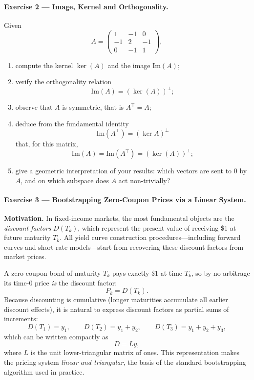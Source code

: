 \documentclass[11pt]{article}
\begin{document}
\paragraph{Exercise 2 — Image, Kernel and Orthogonality.}
Given
\[
A=\begin{pmatrix}
1 & -1 & 0 \\
-1 & 2 & -1 \\
0 & -1 & 1
\end{pmatrix},
\]
\begin{enumerate}
\item compute the kernel $\ker(A)$ and the image $\mathrm{Im}(A)$;
\item verify the orthogonality relation
\[
\mathrm{Im}(A)= (\ker(A))^{\perp};
\]
\item observe that $A$ is symmetric, that is $A^{\top}=A$;
\item deduce from the fundamental identity
\[
\mathrm{Im}(A^{\top})=(\ker A)^{\perp}
\]
that, for this matrix,
\[
\mathrm{Im}(A)=\mathrm{Im}(A^{\top})=(\ker(A))^{\perp};
\]
\item give a geometric interpretation of your results: which vectors are sent to $0$ by $A$, and on which subspace does $A$ act non-trivially?
\end{enumerate}

\paragraph{Exercise 3 — Bootstrapping Zero-Coupon Prices via a Linear System.}

\textbf{Motivation.}
In fixed-income markets, the most fundamental objects are the \emph{discount factors}
\(
D(T_k)
\),
which represent the present value of receiving \$1 at future maturity \(T_k\).
All yield curve construction procedures---including forward curves and short-rate
models---start from recovering these discount factors from market prices.

A zero-coupon bond of maturity \(T_k\) pays exactly \$1 at time \(T_k\), so by
no-arbitrage its time-0 price \emph{is} the discount factor:
\[
P_k = D(T_k).
\]
Because discounting is cumulative (longer maturities accumulate all earlier
discount effects), it is natural to express discount factors as partial sums of
increments:
\[
D(T_1)=y_1,\qquad D(T_2)=y_1+y_2,\qquad D(T_3)=y_1+y_2+y_3,
\]
which can be written compactly as
\[
D = Ly,
\]
where \(L\) is the unit lower-triangular matrix of ones.  
This representation makes the pricing system \emph{linear and triangular}, the
basis of the standard bootstrapping algorithm used in practice.
\end{document}
